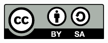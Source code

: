 \documentclass[10pt]{book}
\let\origdoublepage\cleardoublepage
\newcommand{\clearemptydoublepage}{%
  \clearpage
  {\pagestyle{empty}\origdoublepage}%
}
\begin{document}
\begin{figure}[h!]
	\begin{center}
\href{http://creativecommons.org/licenses/by-sa/4.0/}{\includegraphics[scale=0.50]{../images/license}}
		\label{License}
	\end{center}
\end{figure}




\clearemptydoublepage

\end{document}
